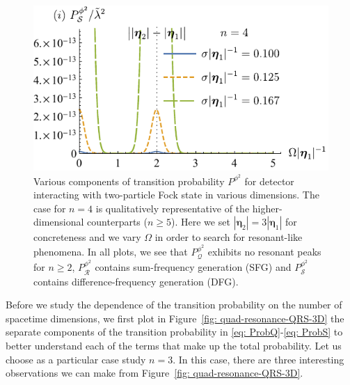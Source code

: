 \documentclass[prd,twocolumn,superscriptaddress,nofootinbib,floatfix,amsmath,amssymb]{revtex4-2}
\newcommand{\ba}{{\bm{\eta}_1}}
\newcommand{\bb}{{\bm{\eta}_2}}
\begin{document}
\begin{figure}[tp]
        \includegraphics[scale=0.64]{Fig6i.pdf}
        \caption{Various components of transition probability $P^{\phi^2}$ for detector interacting with two-particle Fock state in various dimensions. The case for $n=4$ is qualitatively representative of the higher-dimensional counterparts ($n\geq 5$). Here we set $|\bb|=3|\ba|$ for concreteness and we vary $\Omega$ in order to search for resonant-like phenomena. In all plots, we see that $P^{\phi^2}_\mathcal{Q}$ exhibits no resonant peaks for $n\geq 2$, $P^{\phi^2}_\mathcal{R}$ contains sum-frequency generation (SFG) and $P^{\phi^2}_\mathcal{S}$ contains difference-frequency generation (DFG).}
        \label{fig: quad-resonance-QRS-therest}
    \end{figure}    

    
    Before we study the dependence of the transition probability on the number of spacetime dimensions, we first plot in Figure~\ref{fig: quad-resonance-QRS-3D} the separate components of the transition probability in \eqref{eq: ProbQ}-\eqref{eq: ProbS} to better understand each of the terms that make up the total probability. Let us choose as a particular case study $n=3$. In this case, there are three interesting observations we can make from Figure~\ref{fig: quad-resonance-QRS-3D}. 
    
\end{document}
